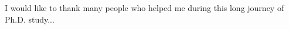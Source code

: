 \startacknowledgementspage
I would like to thank many people who helped me during this long journey of Ph.D. study...
\label{ACKNOWLEDGEMENTS}
